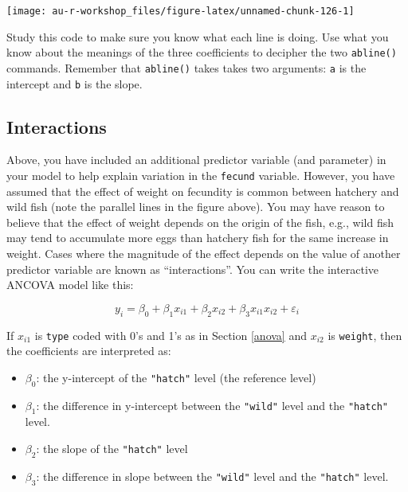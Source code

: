 \documentclass[]{book}
\providecommand{\tightlist}{%
  \setlength{\itemsep}{0pt}\setlength{\parskip}{0pt}}
\theoremstyle{definition}
\theoremstyle{definition}
\theoremstyle{definition}
\theoremstyle{remark}
\begin{document}
\begin{center}\texttt{[image: au-r-workshop\_files/figure-latex/unnamed-chunk-126-1]} \end{center}

Study this code to make sure you know what each line is doing. Use what
you know about the meanings of the three coefficients to decipher the
two \texttt{abline()} commands. Remember that \texttt{abline()} takes
takes two arguments: \texttt{a} is the intercept and \texttt{b} is the
slope.

\subsection{Interactions}\label{interactions}

Above, you have included an additional predictor variable (and
parameter) in your model to help explain variation in the
\texttt{fecund} variable. However, you have assumed that the effect of
weight on fecundity is common between hatchery and wild fish (note the
parallel lines in the figure above). You may have reason to believe that
the effect of weight depends on the origin of the fish, e.g., wild fish
may tend to accumulate more eggs than hatchery fish for the same
increase in weight. Cases where the magnitude of the effect depends on
the value of another predictor variable are known as ``interactions''.
You can write the interactive ANCOVA model like this:

\begin{equation}
  y_i=\beta_0 + \beta_1 x_{i1} + \beta_2 x_{i2} + \beta_3 x_{i1} x_{i2} + \varepsilon_i
\label{eq:ancova-interact}
\end{equation}

If \(x_{i1}\) is \texttt{type} coded with 0's and 1's as in Section
\ref{anova} and \(x_{i2}\) is \texttt{weight}, then the coefficients are
interpreted as:

\begin{itemize}
\tightlist
\item
  \(\beta_0\): the y-intercept of the \texttt{"hatch"} level (the
  reference level)
\item
  \(\beta_1\): the difference in y-intercept between the \texttt{"wild"}
  level and the \texttt{"hatch"} level.
\item
  \(\beta_2\): the slope of the \texttt{"hatch"} level
\item
  \(\beta_3\): the difference in slope between the \texttt{"wild"} level
  and the \texttt{"hatch"} level.
\end{itemize}
\end{document}
